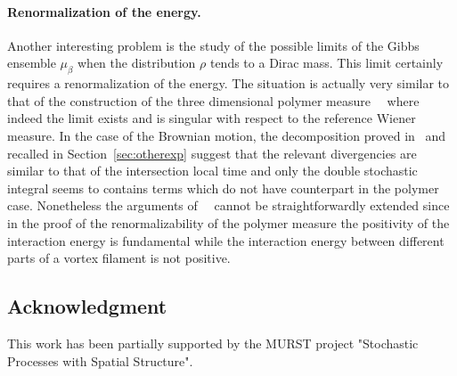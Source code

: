 \paragraph{Renormalization of the energy.} Another interesting problem
is the study of the possible limits of the Gibbs ensemble $\mu_\beta$
when the distribution $\rho$ tends to a Dirac mass. This limit
certainly requires a renormalization of the energy. The situation is
actually very similar to that of the construction of the three dimensional
polymer measure~\cite{Bo}~\cite{We} where indeed the limit exists and is
singular with respect to the reference Wiener measure. In the case of
the Brownian motion, the
decomposition proved in~\cite{Fl2} and recalled in
Section~\ref{sec:otherexp} suggest that the relevant divergencies
are similar to that of the intersection local time and only the double
stochastic integral seems to contains terms which do not have counterpart in the
polymer case. Nonetheless the arguments of~\cite{Bo}~\cite{We} cannot
be straightforwardly extended since in the proof of the
renormalizability of the polymer measure the positivity of the
interaction energy is fundamental while the interaction energy between
different parts of a vortex filament is not positive. 


\subsection*{Acknowledgment} 
This work has been partially supported by the MURST project "Stochastic
Processes with Spatial Structure". 


